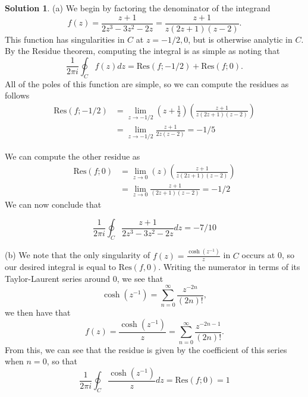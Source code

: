 \documentclass[12pt]{article}
\newcommand{\Res}{\text{Res}}
\theoremstyle{definition}
\newtheorem{sol}{Solution}
\theoremstyle{remark}
\begin{document}
\begin{sol}\leavevmode

    (a) We begin by factoring the denominator of the integrand
    \begin{equation*}
        f(z) = \frac{z+1}{2z^3 - 3z^2 -2z} = \frac{z+1}{z(2z+1)(z-2)}.
    \end{equation*}
    This function has singularities in $C$ at $z= -1/2, 0$, but is otherwise analytic in $C$. By the Residue theorem, computing the integral is as simple as noting that
\begin{equation*}
    \frac{1}{2\pi i} \oint_C f(z)dz = \Res(f; -1/2) + \Res(f; 0).
\end{equation*}
    All of the poles of this function are simple, so we can compute the residues as follows
    \begin{align*}
        \Res(f; -1/2) &= \lim_{z \to -1/2} (z + \frac{1}{2})\left(\frac{z+1}{z(2z+1)(z-2)}\right) \\
                      &= \lim_{z \to -1/2} \frac{z+1}{2z(z-2)} = - 1 / 5 
    \end{align*}

    We can compute the other residue as 
    \begin{align*}
        \Res(f;0) &= \lim_{z \to 0} (z )\left(\frac{z+1}{z(2z+1)(z-2)}\right) \\
                  &= \lim_{z \to 0} \frac{z+1}{(2z+1)(z-2)}  = - 1 / 2  
    \end{align*}
    We can now conclude that

    \begin{equation*}
     \frac{1}{2\pi i} \oint_C \frac{z+1}{2z^3 - 3z^2 -2z} dz = - 7  / 10
    \end{equation*}

    \newpage

    (b) We note that the only singularity of $f(z) = \frac{\cosh(z^{-1})}{z}$ in  $C$ occurs at 0, so our desired integral is equal to $\Res(f, 0)$. Writing the numerator in terms of its Taylor-Laurent series around 0, we see that
     \begin{equation*}
         \cosh(z^{-1}) = \sum_{n=0}^{\infty} \frac{z^{-2n}}{(2n)!},
    \end{equation*}
    we then have that 
    \begin{equation*}
        f(z) = \frac{\cosh(z^{-1})}{z} = \sum_{n=0}^{\infty} \frac{z^{-2n-1}}{(2n)!}.
    \end{equation*}
    From this, we can see that the residue is given by the coefficient of this series when $n=0$, so that 
    \begin{equation*}
        \frac{1}{2\pi i} \oint_C \frac{\cosh(z^{-1})}{z} dz = \Res(f;0) = 1 
    \end{equation*}


\end{sol}
\end{document}
